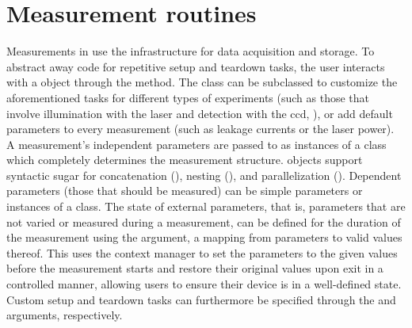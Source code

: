 \section{Measurement routines}\label{sec:exp:mjolnir:measurement}
Measurements in \mjolnir use the \qcodes infrastructure for data acquisition and storage.
To abstract away code for repetitive setup and teardown tasks, the user interacts with a  object through the  method.
The class can be subclassed to customize the aforementioned tasks for different types of experiments (such as those that involve illumination with the laser and detection with the \gls{ccd}, ), or add default parameters to every measurement (such as leakage currents or the laser power).
A measurement's independent parameters are passed to  as instances of a  class which completely determines the measurement structure.
 objects support syntactic sugar for concatenation (), nesting (\code{|}), and parallelization (\code{&}).
Dependent parameters (those that should be measured) can be simple parameters or instances of a  class.
The state of external parameters, that is, parameters that are not varied or measured during a measurement, can be defined for the duration of the measurement using the  argument, a mapping from \qcodes parameters to valid values thereof.
This uses the  context manager to set the parameters to the given values before the measurement starts and restore their original values upon exit in a controlled manner, allowing users to ensure their device is in a well-defined state.
Custom setup and teardown tasks can furthermore be specified through the  and  arguments, respectively.

